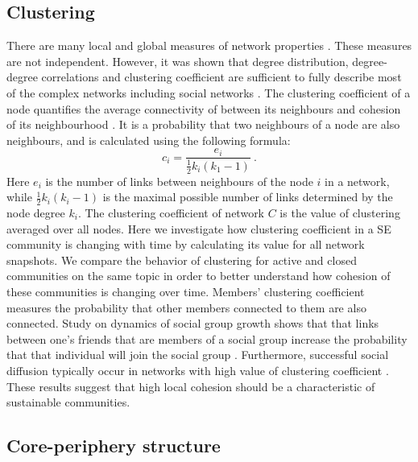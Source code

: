 \subsection{Clustering}
There are many local and global measures of network properties \cite{boccaletti2006complex}. These measures are not independent. However, it was shown that degree distribution, degree-degree correlations and clustering coefficient are sufficient to fully describe most of the complex networks including social networks \cite{orsini2015quantifying}. The clustering coefficient of a node quantifies the average connectivity of between its neighbours and cohesion of its neighbourhood \cite{boccaletti2006complex}. It is a probability that two neighbours of a node are also neighbours, and is calculated using the following formula:
\begin{equation}
c_{i}=\frac{e_{i}}{\frac{1}{2}k_{i}(k_{1}-1)} \ .
\label{eq:clust}
\end{equation}
Here $e_{i}$ is the number of links between neighbours of the node $i$ in a network, while $\frac{1}{2}k_{i}(k_{i}-1)$ is the maximal possible number of links determined by the node degree $k_{i}$. The clustering coefficient of network $C$ is the value of clustering averaged over all nodes. Here we investigate how clustering coefficient in a SE community is changing with time by calculating its value for all network snapshots. We compare the behavior of clustering for active and closed communities on the same topic in order to better understand how cohesion of these communities is changing over time. 
Members' clustering coefficient measures the probability that other members connected to them are also connected. Study on dynamics of social group growth shows that that links between one's friends that are members of a social group increase the probability that that individual will join the social group \cite{backstrom2006group}. Furthermore, successful social diffusion  typically occur in networks with high value of clustering coefficient \cite{centola2007cascade}. These results suggest that high local cohesion should be a characteristic of sustainable communities.

\subsection{Core-periphery structure}


